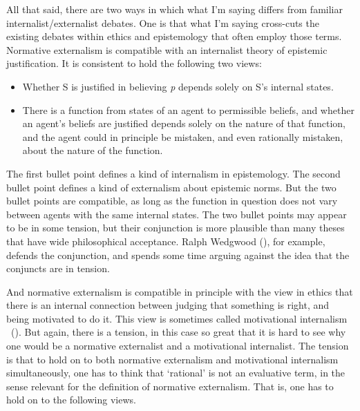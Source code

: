 \documentclass[
  10pt,
  letterpaper,
  twoside]{scrbook}
\providecommand{\tightlist}{%
  \setlength{\itemsep}{0pt}\setlength{\parskip}{0pt}}\usepackage{longtable,booktabs,array}
\begin{document}
All that said, there are two ways in which what I'm saying differs from
familiar internalist/externalist debates. One is that what I'm saying
cross-cuts the existing debates within ethics and epistemology that
often employ those terms. Normative externalism is compatible with an
internalist theory of epistemic justification. It is consistent to hold
the following two views:

\begin{itemize}
\tightlist
\item
  Whether S is justified in believing \emph{p} depends solely on S's
  internal states.
\item
  There is a function from states of an agent to permissible beliefs,
  and whether an agent's beliefs are justified depends solely on the
  nature of that function, and the agent could in principle be mistaken,
  and even rationally mistaken, about the nature of the function.
\end{itemize}

The first bullet point defines a kind of internalism in epistemology.
The second bullet point defines a kind of externalism about epistemic
norms. But the two bullet points are compatible, as long as the function
in question does not vary between agents with the same internal states.
The two bullet points may appear to be in some tension, but their
conjunction is more plausible than many theses that have wide
philosophical acceptance. Ralph Wedgwood
(), for example, defends the
conjunction, and spends some time arguing against the idea that the
conjuncts are in tension.

And normative externalism is compatible in principle with the view in
ethics that there is an internal connection between judging that
something is right, and being motivated to do it. This view is sometimes
called motivational internalism ~(). But again, there is a tension, in this case so great that it is
hard to see why one would be a normative externalist and a motivational
internalist. The tension is that to hold on to both normative
externalism and motivational internalism simultaneously, one has to
think that `rational' is not an evaluative term, in the sense relevant
for the definition of normative externalism. That is, one has to hold on
to the following views.
\end{document}
